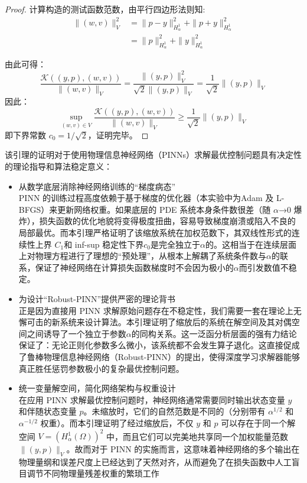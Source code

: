 \documentclass[UTF8, 12pt]{ctexart}
\begin{document}
\begin{proof}
计算构造的测试函数范数，由平行四边形法则知:
\begin{align}
\|(w,v)\|_V^2 
&= \|p-y\|_{H_\alpha^1}^2 + \|p+y\|_{H_\alpha^1}^2 \\
&= \|p\|_{H_\alpha^1}^2 + \|y\|_{H_\alpha^1}^2
\end{align}

由此可得：
\begin{equation}
\frac{\mathcal{K}((y,p), (w,v))}{\|(w,v)\|_V} = \frac{\|(y,p)\|_V^2}{\sqrt{2}\|(y,p)\|_V} = \frac{1}{\sqrt{2}}\|(y,p)\|_V
\end{equation}
因此：
\begin{equation}
\sup_{(w,v)\in V} \frac{\mathcal{K}((y,p), (w,v))}{\|(w,v)\|_V} \ge \frac{1}{\sqrt{2}} \|(y,p)\|_V
\end{equation}
即下界常数 $c_0 = 1/\sqrt{2}$，证明完毕。
\end{proof}
该引理的证明对于使用物理信息神经网络（PINNs）求解最优控制问题具有决定性的理论指导和算法稳定意义：
\begin{itemize}
    \item 从数学底层消除神经网络训练的“梯度病态”\\
    PINN 的训练过程高度依赖于基于梯度的优化器（本实验中为Adam 及 L-BFGS）来更新网络权重。如果底层的 PDE 系统本身条件数很差（随 $\alpha$→0 爆炸），损失函数的优化地貌将变得极度扭曲，容易导致梯度崩溃或陷入不良的局部最优。而本引理严格证明了该缩放系统在加权范数下，其双线性形式的连续性上界 $C_1$和 inf-sup 稳定性下界$c_0$是完全独立于$\alpha$的。这相当于在连续层面上对物理方程进行了理想的“预处理”，从根本上解耦了系统条件数与$\alpha$的联系，保证了神经网络在计算损失函数梯度时不会因为极小的$\alpha$而引发数值不稳定。
    \item 为设计“Robust-PINN”提供严密的理论背书\\
    正是因为直接用 PINN 求解原始问题存在不稳定性，我们需要一套在理论上无懈可击的新系统来设计算法。本引理证明了缩放后的系统在解空间及其对偶空间之间诱导了一个独立于参数$\alpha$的同构关系。这一泛函分析层面的强有力结论保证了：无论正则化参数多么微小，该系统都不会发生算子退化。这直接促成了鲁棒物理信息神经网络（Robust-PINN）的提出，使得深度学习求解器能够真正胜任惩罚参数极小的复杂最优控制问题。
    \item 统一变量解空间，简化网络架构与权重设计\\
    在应用 PINN 求解最优控制问题时，神经网络通常需要同时输出状态变量 $y$ 和伴随状态变量 $p$。未缩放时，它们的自然范数是不同的（分别带有 $\alpha^{1/2}$ 和 $\alpha^{-1/2}$ 权重）。而本引理证明了经过缩放后，不仅 $y$ 和 $p$ 可以存在于同一个解空间 $V = (H_\alpha^1(\Omega))^2$ 中，而且它们可以完美地共享同一个加权能量范数 $\|(y,p)\|_V$。故而对于 PINN 的实施而言，这意味着神经网络的多个输出在物理量纲和误差尺度上已经达到了天然对齐，从而避免了在损失函数中人工盲目调节不同物理量残差权重的繁琐工作


\end{itemize}
\end{document}
